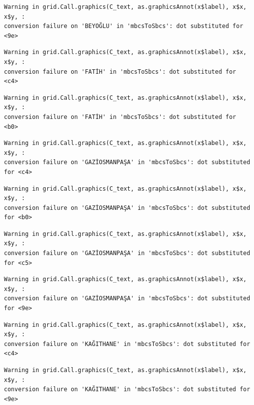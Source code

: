 \documentclass[
  11pt,
  a4paper,
  DIV=11,
  numbers=noendperiod]{scrartcl}
\begin{document}
\begin{verbatim}
Warning in grid.Call.graphics(C_text, as.graphicsAnnot(x$label), x$x, x$y, :
conversion failure on 'BEYOĞLU' in 'mbcsToSbcs': dot substituted for <9e>
\end{verbatim}

\begin{verbatim}
Warning in grid.Call.graphics(C_text, as.graphicsAnnot(x$label), x$x, x$y, :
conversion failure on 'FATİH' in 'mbcsToSbcs': dot substituted for <c4>
\end{verbatim}

\begin{verbatim}
Warning in grid.Call.graphics(C_text, as.graphicsAnnot(x$label), x$x, x$y, :
conversion failure on 'FATİH' in 'mbcsToSbcs': dot substituted for <b0>
\end{verbatim}

\begin{verbatim}
Warning in grid.Call.graphics(C_text, as.graphicsAnnot(x$label), x$x, x$y, :
conversion failure on 'GAZİOSMANPAŞA' in 'mbcsToSbcs': dot substituted for <c4>
\end{verbatim}

\begin{verbatim}
Warning in grid.Call.graphics(C_text, as.graphicsAnnot(x$label), x$x, x$y, :
conversion failure on 'GAZİOSMANPAŞA' in 'mbcsToSbcs': dot substituted for <b0>
\end{verbatim}

\begin{verbatim}
Warning in grid.Call.graphics(C_text, as.graphicsAnnot(x$label), x$x, x$y, :
conversion failure on 'GAZİOSMANPAŞA' in 'mbcsToSbcs': dot substituted for <c5>
\end{verbatim}

\begin{verbatim}
Warning in grid.Call.graphics(C_text, as.graphicsAnnot(x$label), x$x, x$y, :
conversion failure on 'GAZİOSMANPAŞA' in 'mbcsToSbcs': dot substituted for <9e>
\end{verbatim}

\begin{verbatim}
Warning in grid.Call.graphics(C_text, as.graphicsAnnot(x$label), x$x, x$y, :
conversion failure on 'KAĞITHANE' in 'mbcsToSbcs': dot substituted for <c4>
\end{verbatim}

\begin{verbatim}
Warning in grid.Call.graphics(C_text, as.graphicsAnnot(x$label), x$x, x$y, :
conversion failure on 'KAĞITHANE' in 'mbcsToSbcs': dot substituted for <9e>
\end{verbatim}
\end{document}
